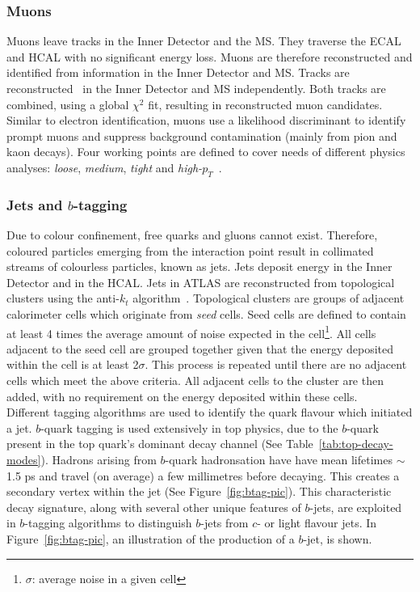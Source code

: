 \subsubsection{Muons}
Muons leave tracks in the Inner Detector and the MS. They traverse the ECAL and HCAL with no significant energy loss. Muons are therefore reconstructed and identified from information in the Inner Detector and MS. Tracks are reconstructed~\cite{muonIDEfficiency} in the Inner Detector and MS independently. Both tracks are combined, using a global $\chi^{2}$ fit, resulting in reconstructed muon candidates.\\

Similar to electron identification, muons use a likelihood discriminant to identify prompt muons and suppress background contamination (mainly from pion and kaon decays). Four working points are defined to cover needs of different physics analyses: \textit{loose}, \textit{medium}, \textit{tight} and \textit{high-$p_{T}$}~\cite{muonIDEfficiency}. 

\subsubsection{Jets and $b$-tagging}
\label{sec:jets-btagging}
Due to colour confinement, free quarks and gluons cannot exist. Therefore, coloured particles emerging from the interaction point result in collimated streams of colourless particles, known as jets. Jets deposit energy in the Inner Detector and in the HCAL. Jets in ATLAS are reconstructed from topological clusters using the anti-$k_{t}$ algorithm~\cite{Cacciari:2008gp}. Topological clusters are groups of adjacent calorimeter cells which originate from \textit{seed} cells. Seed cells are defined to contain at least 4 times the average amount of noise expected in the cell\footnote{$\sigma$: average noise in a given cell}. All cells adjacent to the seed cell are grouped together given that the energy deposited within the cell is at least 2$\sigma$. This process is repeated until there are no adjacent cells which meet the above criteria. All adjacent cells to the cluster are then added, with no requirement on the energy deposited within these cells.\\

Different tagging algorithms are used to identify the quark flavour which initiated a jet. $b$-quark tagging is used extensively in top physics, due to the $b$-quark present in the top quark's dominant decay channel (See Table~\ref{tab:top-decay-modes}). Hadrons arising from $b$-quark hadronsation have have mean lifetimes $\sim$1.5 ps and travel (on average) a few millimetres before decaying. This creates a secondary vertex within the jet (See Figure~\ref{fig:btag-pic}). This characteristic decay signature, along with several other unique features of $b$-jets, are exploited in $b$-tagging algorithms to distinguish $b$-jets from $c$- or light flavour jets. In Figure~\ref{fig:btag-pic}, an illustration of the production of a $b$-jet, is shown.

